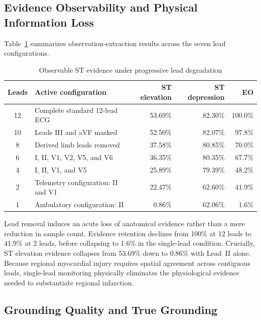 \documentclass{ssnreview}
\begin{document}
\subsection{Evidence Observability and Physical Information Loss}

Table~\ref{tab:evidence-retention} summarizes observation-extraction results across the seven
lead configurations.

\begin{table}[H]
  \centering
  \small
  \caption{Observable ST evidence under progressive lead degradation}
  \label{tab:evidence-retention}
  \begin{tabularx}{\textwidth}{@{}c>{\raggedright\arraybackslash}Xrrr@{}}
    \toprule
    \textbf{Leads} & \textbf{Active configuration} &
    \textbf{ST elevation} & \textbf{ST depression} &
    \textbf{EO} \\
    \midrule
    12 & Complete standard 12-lead ECG & 53.69\% & 82.30\% & 100.0\% \\
    10 & Leads III and aVF masked & 52.50\% & 82.07\% & 97.8\% \\
    8 & Derived limb leads removed & 37.58\% & 80.85\% & 70.0\% \\
    6 & I, II, V1, V2, V5, and V6 & 36.35\% & 80.35\% & 67.7\% \\
    4 & I, II, V1, and V5 & 25.89\% & 79.39\% & 48.2\% \\
    2 & Telemetry configuration: II and V1 & 22.47\% & 62.60\% & 41.9\% \\
    1 & Ambulatory configuration: II & 0.86\% & 62.06\% & 1.6\% \\
    \bottomrule
  \end{tabularx}
\end{table}

Lead removal induces an acute loss of anatomical evidence rather than a mere reduction in sample
count. Evidence retention declines from 100\% at 12 leads to 41.9\% at 2 leads, before collapsing
to 1.6\% in the single-lead condition. Crucially, ST elevation evidence collapses from 53.69\%
down to 0.86\% with Lead~II alone. Because regional myocardial injury requires spatial agreement
across contiguous leads, single-lead monitoring physically eliminates the physiological evidence
needed to substantiate regional infarction.

\subsection{Grounding Quality and True Grounding}
\end{document}
